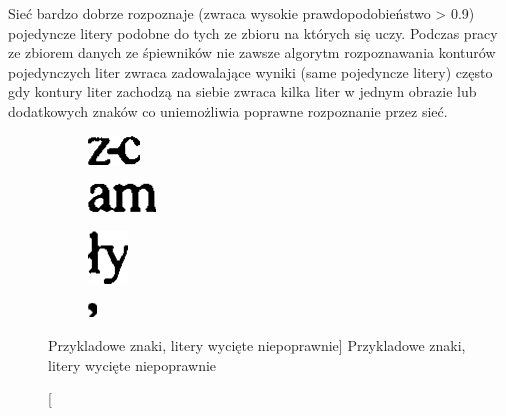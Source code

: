 \documentclass[a4paper,12pt]{article}
\begin{document}
            Sieć bardzo dobrze rozpoznaje (zwraca wysokie prawdopodobieństwo > 0.9) pojedyncze litery podobne do tych ze zbioru na których się uczy. Podczas pracy ze zbiorem danych ze śpiewników nie zawsze algorytm rozpoznawania konturów pojedynczych liter zwraca zadowalające wyniki (same pojedyncze litery) często gdy kontury liter zachodzą na siebie zwraca kilka liter w jednym obrazie lub dodatkowych znaków co uniemożliwia poprawne rozpoznanie przez sieć. 

            \begin{figure}[h!]
                \centering
                \begin{subfigure}[b]{2cm}
                    \includegraphics[frame]{image//practicalPart//w_letter_01.png}
                \caption{}
                \end{subfigure}
                \begin{subfigure}[b]{2cm}
                    \includegraphics[frame]{image//practicalPart//w_letter_02.png}
                \caption{}
                \end{subfigure}
              \newline
                \begin{subfigure}[b]{2cm}
                    \includegraphics[frame]{image//practicalPart//w_letter_03.png}
                \caption{}
                \end{subfigure}
                \begin{subfigure}[b]{2cm}
                    \includegraphics[frame]{image//practicalPart//w_letter_04.png}
                    \caption{}
                \end{subfigure}
                \caption
                    [Przykladowe znaki, litery wycięte niepoprawnie]
                    {Przykladowe znaki, litery wycięte niepoprawnie}
            \end{figure}
\end{document}
